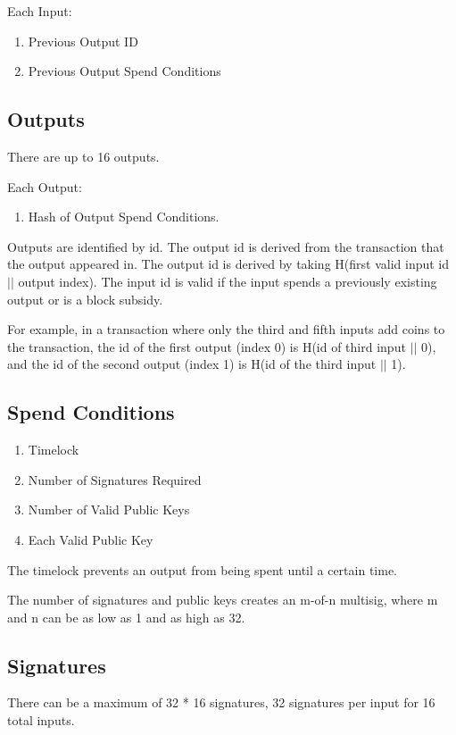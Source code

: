 \documentclass[twocolumn]{article}
\begin{document}
Each Input:
\begin{enumerate}
	\item Previous Output ID
	\item Previous Output Spend Conditions
\end{enumerate}

\subsection{Outputs}
There are up to 16 outputs.

Each Output:
\begin{enumerate}
	\item Hash of Output Spend Conditions.
\end{enumerate}

Outputs are identified by id.
The output id is derived from the transaction that the output appeared in.
The output id is derived by taking H(first valid input id $||$ output index).
The input id is valid if the input spends a previously existing output or is a block subsidy.

For example, in a transaction where only the third and fifth inputs add coins to the transaction, the id of the first output (index 0) is H(id of third input $||$ 0), and the id of the second output (index 1) is H(id of the third input $||$ 1).

\subsection{Spend Conditions}
\begin{enumerate}
	\item Timelock
	\item Number of Signatures Required
	\item Number of Valid Public Keys
	\item Each Valid Public Key
\end{enumerate}

The timelock prevents an output from being spent until a certain time.

The number of signatures and public keys creates an m-of-n multisig, where m and n can be as low as 1 and as high as 32.

\subsection{Signatures}
There can be a maximum of 32 * 16 signatures, 32 signatures per input for 16 total inputs.
\end{document}

